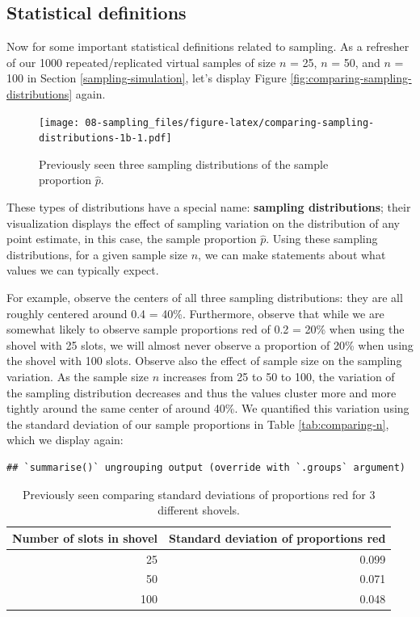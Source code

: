 \documentclass[
]{book}
\begin{document}
\hypertarget{sampling-definitions}{%
\subsection{Statistical definitions}\label{sampling-definitions}}

Now for some important statistical definitions related to sampling. As a refresher of our 1000 repeated/replicated virtual samples of size \(n\) = 25, \(n\) = 50, and \(n\) = 100 in Section \ref{sampling-simulation}, let's display Figure \ref{fig:comparing-sampling-distributions} again.

\begin{figure}
\centering
\texttt{[image: 08-sampling\_files/figure-latex/comparing-sampling-distributions-1b-1.pdf]}
\caption{\label{fig:comparing-sampling-distributions-1b}Previously seen three sampling distributions of the sample proportion \(\widehat{p}\).}
\end{figure}

These types of distributions have a special name: \textbf{sampling distributions};  their visualization displays the effect of sampling variation on the distribution of any point estimate, in this case, the sample proportion \(\widehat{p}\). Using these sampling distributions, for a given sample size \(n\), we can make statements about what values we can typically expect.

For example, observe the centers of all three sampling distributions: they are all roughly centered around 0.4 = 40\%. Furthermore, observe that while we are somewhat likely to observe sample proportions red of 0.2 = 20\% when using the shovel with 25 slots, we will almost never observe a proportion of 20\% when using the shovel with 100 slots. Observe also the effect of sample size on the sampling variation. As the sample size \(n\) increases from 25 to 50 to 100,  the variation of the sampling distribution decreases and thus the values cluster more and more tightly around the same center of around 40\%. We quantified this variation using the standard deviation of our sample proportions in Table \ref{tab:comparing-n}, which we display again:

\begin{verbatim}
## `summarise()` ungrouping output (override with `.groups` argument)
\end{verbatim}

\begin{table}[!h]

\caption{\label{tab:comparing-n-repeat}Previously seen comparing standard deviations of proportions red for 3 different shovels.}
\centering
\fontsize{10}{12}\selectfont
\begin{tabular}[t]{rr}
\toprule
Number of slots in shovel & Standard deviation of proportions red\\
\midrule
25 & 0.099\\
50 & 0.071\\
100 & 0.048\\
\bottomrule
\end{tabular}
\end{table}
\end{document}
